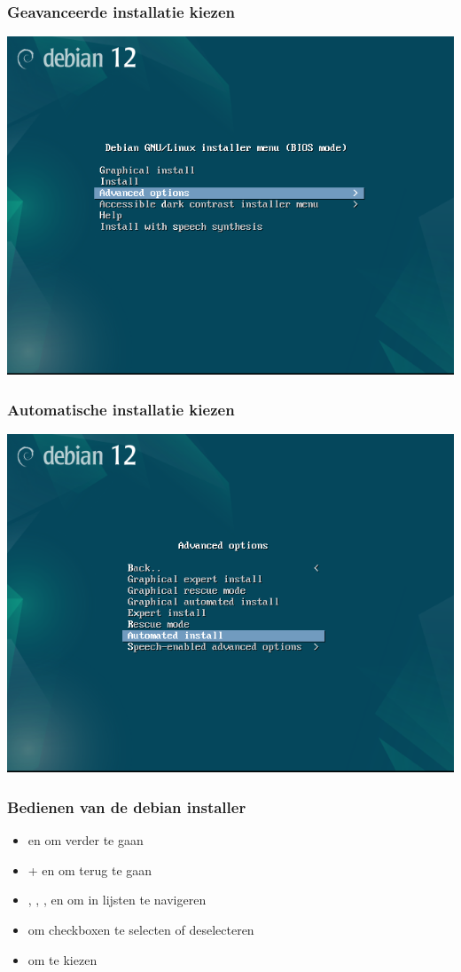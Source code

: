 \documentclass{beamer}
\begin{document}
\begin{frame}
  \frametitle{Geavanceerde installatie kiezen}

  \centering
  \includegraphics[width=\textwidth]{img/advanced-options.png}
\end{frame}

\begin{frame}
  \frametitle{Automatische installatie kiezen}

  \centering
  \includegraphics[width=\textwidth]{img/automated-install.png}
\end{frame}

\begin{frame}
   \frametitle{Bedienen van de debian installer}
   \begin{itemize}
      \item \Tab{} en \RArrow{} om verder te gaan
      \item \Shift{}+\Tab{} en \LArrow{} om terug te gaan
      \item \UArrow{}, \DArrow{}, \PgUp{}, en \PgDown om in lijsten te navigeren
      \item \Spacebar om checkboxen te selecten of deselecteren
      \item \Enter om te kiezen
   \end{itemize}
\end{frame}
\end{document}
